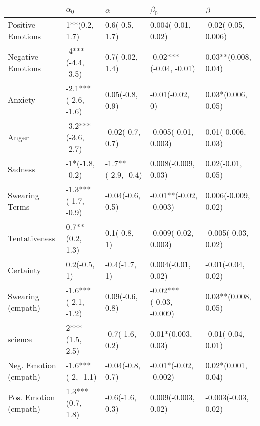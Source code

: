\begin{tabular}{lllll}
\toprule
{} &           $\alpha_0$ &            $\alpha$ &                $\beta_0$ &              $\beta$ \\
\midrule
Positive Emotions     &        1**(0.2, 1.7) &      0.6(-0.5, 1.7) &       0.004(-0.01, 0.02) &  -0.02(-0.05, 0.006) \\
Negative Emotions     &    -4***(-4.4, -3.5) &     0.7(-0.02, 1.4) &   -0.02***(-0.04, -0.01) &  0.03**(0.008, 0.04) \\
Anxiety               &  -2.1***(-2.6, -1.6) &     0.05(-0.8, 0.9) &          -0.01(-0.02, 0) &   0.03*(0.006, 0.05) \\
Anger                 &  -3.2***(-3.6, -2.7) &    -0.02(-0.7, 0.7) &     -0.005(-0.01, 0.003) &   0.01(-0.006, 0.03) \\
Sadness               &      -1*(-1.8, -0.2) &  -1.7**(-2.9, -0.4) &      0.008(-0.009, 0.03) &    0.02(-0.01, 0.05) \\
Swearing Terms        &  -1.3***(-1.7, -0.9) &    -0.04(-0.6, 0.5) &   -0.01**(-0.02, -0.003) &  0.006(-0.009, 0.02) \\
Tentativeness         &      0.7**(0.2, 1.3) &        0.1(-0.8, 1) &     -0.009(-0.02, 0.003) &  -0.005(-0.03, 0.02) \\
Certainty             &         0.2(-0.5, 1) &       -0.4(-1.7, 1) &       0.004(-0.01, 0.02) &   -0.01(-0.04, 0.02) \\
Swearing (empath)     &  -1.6***(-2.1, -1.2) &     0.09(-0.6, 0.8) &  -0.02***(-0.03, -0.009) &  0.03**(0.008, 0.05) \\
science               &       2***(1.5, 2.5) &     -0.7(-1.6, 0.2) &       0.01*(0.003, 0.03) &   -0.01(-0.04, 0.01) \\
Neg. Emotion (empath) &    -1.6***(-2, -1.1) &    -0.04(-0.8, 0.7) &    -0.01*(-0.02, -0.002) &   0.02*(0.001, 0.04) \\
Pos. Emotion (empath) &     1.3***(0.7, 1.8) &     -0.6(-1.6, 0.3) &      0.009(-0.003, 0.02) &  -0.003(-0.03, 0.02) \\
\bottomrule
\end{tabular}

